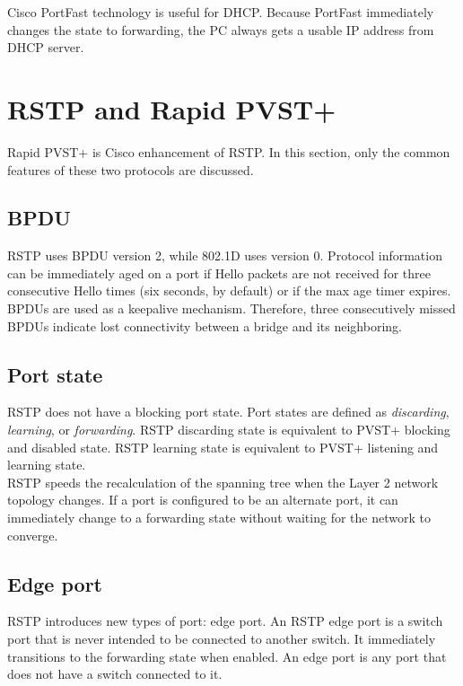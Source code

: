 Cisco PortFast technology is useful for DHCP. Because PortFast immediately changes the state to forwarding, the PC always gets a usable IP address from DHCP server.


\section{RSTP and Rapid PVST+}

Rapid PVST+ is Cisco enhancement of RSTP. In this section, only the common features of these two protocols are discussed.

\subsection{BPDU}
RSTP uses BPDU version 2, while 802.1D uses version 0. Protocol information can be immediately aged on a port if Hello packets are not received for three consecutive Hello times (six seconds, by default) or if the max age timer expires. BPDUs are used as a keepalive mechanism. Therefore, three consecutively missed BPDUs indicate lost connectivity between a bridge and its neighboring.\\

\subsection{Port state}
RSTP does not have a blocking port state. Port states are defined as \emph{discarding}, \emph{learning}, or \emph{forwarding}. RSTP discarding state is equivalent to PVST+ blocking and disabled state. RSTP learning state is equivalent to PVST+ listening and learning state.\\

RSTP speeds the recalculation of the spanning tree when the Layer 2 network topology changes. If a port is configured to be an alternate port, it can immediately change to a forwarding state without waiting for the network to converge.\\

\subsection{Edge port}
RSTP introduces new types of port: edge port. An RSTP edge port is a switch port that is never intended to be connected to another switch. It immediately transitions to the forwarding state when enabled. An edge port is any port that does not have a switch connected to it.

